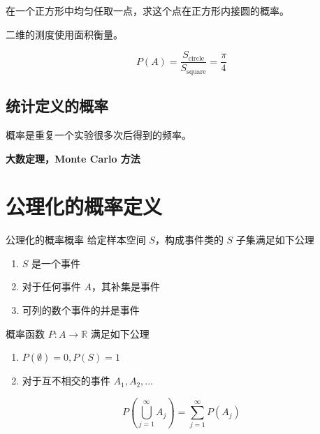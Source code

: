 \begin{example}{}{}
    在一个正方形中均匀任取一点，求这个点在正方形内接圆的概率。
    \begin{center}
    \end{center}
    
    二维的测度使用面积衡量。
    
    $$
    P(A) = \frac{S_{\text{circle}}}{S_{\text{square}}} = \frac{\pi}{4}
    $$
    
\end{example}

\subsection{统计定义的概率}

概率是重复一个实验很多次后得到的频率。

\textbf{大数定理，Monte Carlo 方法}

\newpage

\section{公理化的概率定义}

\begin{definition}{公理化的概率}{概率}
    给定样本空间 $S$，构成事件类的 $S$ 子集满足如下公理
    
    \begin{enumerate}
        \item $S$ 是一个事件
        \item 对于任何事件 $A$，其补集是事件
        \item 可列的数个事件的并是事件
    \end{enumerate}
    
    概率函数 $P: A \to \mathbb{R}$ 满足如下公理
    
    \begin{enumerate}
        \item $P(\emptyset) = 0, P(S) = 1$
        \item 对于互不相交的事件 $A_1, A_2, \dots$
    \end{enumerate}
    
    $$
    P\left(\bigcup_{j = 1}^{\infty} A_j \right) = \sum_{j = 1}^{\infty} P(A_j)
    $$
\end{definition}


